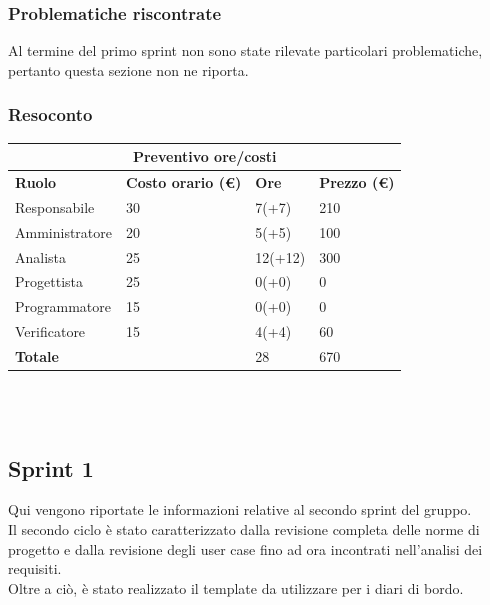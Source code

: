 \documentclass[10pt]{article}
\begin{document}
\subsubsection{Problematiche riscontrate}
Al termine del primo sprint non sono state rilevate particolari problematiche, pertanto questa sezione non ne riporta.
\subsubsection{Resoconto}
\begin{center}
	\begin{tabularx}{\textwidth}{|X|X|X|X|}
		\hline
		\multicolumn{4}{|c|}{\textbf{Preventivo ore/costi}}                                      \\
		\hline
		\hline
		\textbf{Ruolo}  & \textbf{Costo orario (\euro)} & \textbf{Ore} & \textbf{Prezzo (\euro)} \\
		\hline
		Responsabile    & 30                            & 7(+7)        & 210                     \\
		\hline
		Amministratore  & 20                            & 5(+5)        & 100                     \\
		\hline
		Analista        & 25                            & 12(+12)      & 300                     \\
		\hline
		Progettista     & 25                            & 0(+0)        & 0                       \\
		\hline
		Programmatore   & 15                            & 0(+0)        & 0                       \\
		\hline
		Verificatore    & 15                            & 4(+4)        & 60                      \\
		\hline
		\hline
		\textbf{Totale} &                               & 28           & 670                     \\
		\hline
	\end{tabularx}\\[8pt]
	\mbox{}\\
\end{center}


\subsection{Sprint 1}
Qui vengono riportate le informazioni relative al secondo sprint del gruppo. \\
Il secondo ciclo è stato caratterizzato dalla revisione completa delle norme di progetto e dalla revisione degli user case fino ad ora incontrati nell'analisi dei requisiti.\\
Oltre a ciò, è stato realizzato il template da utilizzare per i diari di bordo.
\end{document}

